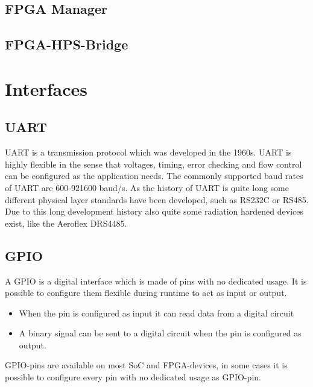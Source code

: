 \subsection{FPGA Manager}
\subsection{FPGA-HPS-Bridge}


\section{Interfaces}
\subsection{UART}
UART is a transmission protocol which was developed in the 1960s. UART is highly flexible in the sense that voltages, timing, error checking and flow control can be configured as the application needs. The commonly supported baud rates of UART are 600-921600 baud/s. As the history of UART is quite long some different physical layer standards have been developed, such as RS232C or RS485. Due to this long development history also quite some radiation hardened devices exist, like the Aeroflex DRS4485.\cite{aeroflex14}
\subsection{GPIO}
A GPIO is a digital interface which is made of pins with no dedicated usage. It is possible to configure them flexible during runtime to act as input or output.
\begin{itemize}
\item When the pin is configured as input it can read data from a digital circuit
\item A binary signal can be sent to a digital circuit when the pin is configured as output.
\end{itemize}
GPIO-pins are available on most SoC and FPGA-devices, in some cases it is possible to configure every pin with no dedicated usage as GPIO-pin.\cite{kernelgpio15}
